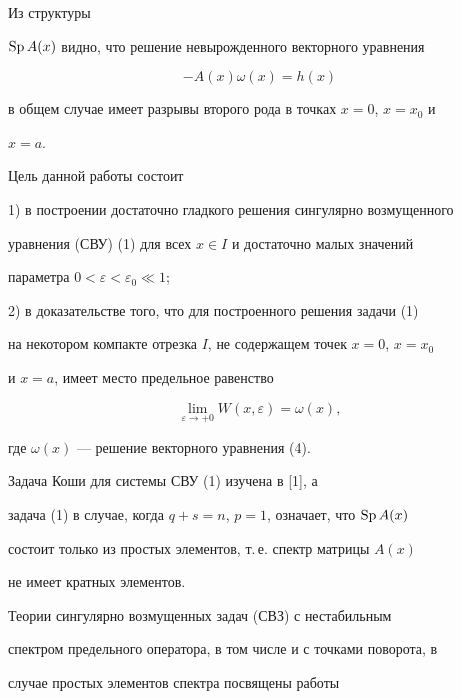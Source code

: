  


Из структуры 


$\operatorname{Sp} A(x)$ видно, что решение невырожденного векторного уравнения 


\begin{equation} 


-A(x)\omega(x)=h(x) 


\tag{4} 


\end{equation} 


в общем случае имеет разрывы второго рода в точках $x=0$, $x=x_0$ и 


$x=a$. 


 


Цель данной работы состоит 


 


1) в построении достаточно гладкого решения сингулярно возмущенного 


уравнения (СВУ) (1) для всех $x\in I$ и достаточно малых значений 


параметра $0<\varepsilon<\varepsilon_0\ll 1$; 


 


2) в доказательстве того, что для построенного решения задачи (1) 


на некотором компакте отрезка $I$, не содержащем точек $x=0$, $x=x_0$ 


и $x=a$, имеет место предельное равенство 


$$ 


\lim_{\varepsilon\to +0}W(x,\varepsilon)=\omega(x), 


$$ 


где $\omega(x)$ --- решение векторного уравнения (4). 


 


Задача Коши для системы СВУ (1) изучена в [1], а 


задача (1) в случае, когда $q+s=n$, $p=1$, означает, что $\operatorname{Sp} A(x)$ 


состоит только из простых элементов, т.\,е. спектр матрицы $A(x)$ 


не имеет кратных элементов.


Теории сингулярно возмущенных задач (СВЗ) с нестабильным 


спектром предельного оператора, в том числе и с точками поворота, в 


случае простых элементов спектра посвящены работы 


